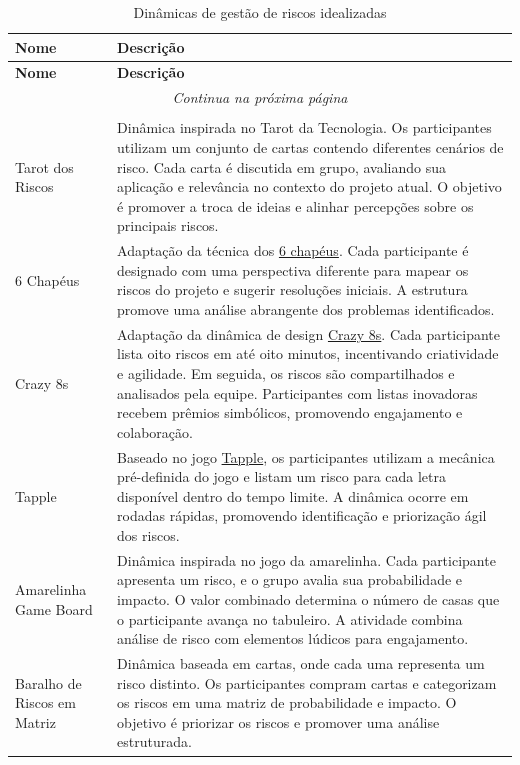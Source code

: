 \documentclass[
	12pt,
	openright,
	twoside,
	a4paper,
	english,
	brazil
	]{abntex2}
\begin{document}
\begin{longtable}{|p{3cm}|p{12cm}|}
  \caption{Dinâmicas de gestão de riscos idealizadas} \label{tab:dinamicas} \\ \hline
  \textbf{Nome} & \textbf{Descrição} \\ \hline
  \endfirsthead
  \hline
  \textbf{Nome} & \textbf{Descrição} \\ \hline
  \endhead
  \hline
  \multicolumn{2}{|c|}{\textit{Continua na próxima página}} \\ \hline
  \endfoot
  \hline
  \multicolumn{2}{|c|}{\textit{Fim da tabela}} \\ \hline
  \endlastfoot
  Tarot dos Riscos & Dinâmica inspirada no Tarot da Tecnologia. Os participantes utilizam um conjunto de cartas contendo diferentes cenários de risco. Cada carta é discutida em grupo, avaliando sua aplicação e relevância no contexto do projeto atual. O objetivo é promover a troca de ideias e alinhar percepções sobre os principais riscos. \\ \hline
  6 Chapéus & Adaptação da técnica dos \href{https://brasil.uxdesign.cc/escolhendo-ferramentas-six-thinking-hats-2e30da00ec9b}{6 chapéus}. Cada participante é designado com uma perspectiva diferente para mapear os riscos do projeto e sugerir resoluções iniciais. A estrutura promove uma análise abrangente dos problemas identificados. \\ \hline
  Crazy 8s & Adaptação da dinâmica de design \href{https://laboratoriobridge.github.io/bthinking/pt/methods/crazy8/}{Crazy 8s}. Cada participante lista oito riscos em até oito minutos, incentivando criatividade e agilidade. Em seguida, os riscos são compartilhados e analisados pela equipe. Participantes com listas inovadoras recebem prêmios simbólicos, promovendo engajamento e colaboração. \\ \hline
  Tapple & Baseado no jogo \href{https://ludopedia.com.br/jogo/tapple}{Tapple}, os participantes utilizam a mecânica pré-definida do jogo e listam um risco para cada letra disponível dentro do tempo limite. A dinâmica ocorre em rodadas rápidas, promovendo identificação e priorização ágil dos riscos. \\ \hline
  Amarelinha Game Board & Dinâmica inspirada no jogo da amarelinha. Cada participante apresenta um risco, e o grupo avalia sua probabilidade e impacto. O valor combinado determina o número de casas que o participante avança no tabuleiro. A atividade combina análise de risco com elementos lúdicos para engajamento. \\ \hline
  Baralho de Riscos em Matriz & Dinâmica baseada em cartas, onde cada uma representa um risco distinto. Os participantes compram cartas e categorizam os riscos em uma matriz de probabilidade e impacto. O objetivo é priorizar os riscos e promover uma análise estruturada. \\ \hline

\end{longtable}
\end{document}
